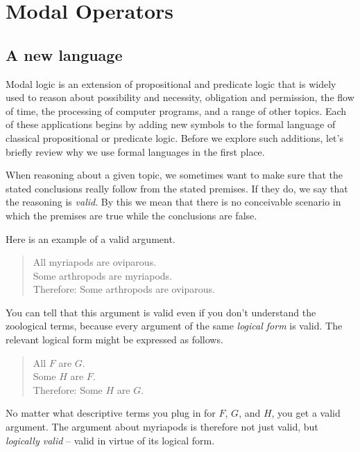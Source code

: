 \chapter{Modal Operators}\label{ch:operators}

\section{A new language}
\label{sec:intro}


Modal logic is an extension of propositional and predicate logic that is widely
used to reason about possibility and necessity, obligation and permission, the
flow of time, the processing of computer programs, and a range of other topics.
Each of these applications begins by adding new symbols to the formal language
of classical propositional or predicate logic. Before we explore such additions,
let's briefly review why we use formal languages in the first place.


When reasoning about a given topic, we sometimes want to make sure that the
stated conclusions really follow from the stated premises. If they do, we say
that the reasoning is \emph{valid}. By this we mean that there is no conceivable
scenario in which the premises are true while the conclusions are false.


Here is an example of a valid argument.
%
\begin{quote}
  All myriapods are oviparous.\\
  Some arthropods are myriapods.\\
  Therefore: Some arthropods are oviparous.
\end{quote}
%
You can tell that this argument is valid even if you don't understand the
zoological terms, because every argument of the same \emph{logical form} is
valid. The relevant logical form might be expressed as follows.
%
\begin{quote}
  All $F$ are $G$.\\
  Some $H$ are $F$.\\
  Therefore: Some $H$ are $G$.
\end{quote}
%
No matter what descriptive terms you plug in for $F$, $G$, and $H$, you get a
valid argument. The argument about myriapods is therefore not just valid, but
\emph{logically valid} -- valid in virtue of its logical form.


